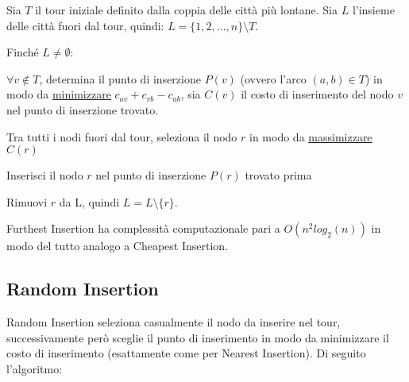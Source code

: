 \documentclass[a4paper,12pt]{report}
\begin{document}
\begin{tcolorbox}[colframe=black,colback=white,boxrule=0.5pt, sharp corners]
\begin{legal}
  \item Sia $T$ il tour iniziale definito dalla coppia delle città più lontane. Sia $L$ l'insieme delle città fuori dal tour, quindi: $L = \{1, 2, ..., n\} \setminus T$.
  \item Finché $L \neq \emptyset$:
  \begin{legal}
    \item $\forall v \not \in T$, determina il punto di inserzione $P(v)$ (ovvero l'arco $(a, b) \in T$) in modo da \underline{minimizzare} $c_{av} + c_{vb} - c_{ab}$, sia $C(v)$ il costo di inserimento del nodo $v$ nel punto di inserzione trovato.
    \item Tra tutti i nodi fuori dal tour, seleziona il nodo $r$ in modo da \underline{massimizzare} $C(r)$
    \item Inserisci il nodo $r$ nel punto di inserzione $P(r)$ trovato prima
    \item Rimuovi $r$ da L, quindi $L = L \setminus \{r\}$.
  \end{legal}
\end{legal}
\end{tcolorbox}
\hfill \break Furthest Insertion ha complessità computazionale pari a $O(n^2 log_2(n))$ in modo del tutto analogo a Cheapest Insertion.

\subsection{Random Insertion} \label{ssec:RI}
Random Insertion seleziona casualmente il nodo da inserire nel tour, successivamente però sceglie il punto di inserimento in modo da minimizzare il costo di inserimento (esattamente come per Nearest Insertion). Di seguito l'algoritmo:
\end{document}
